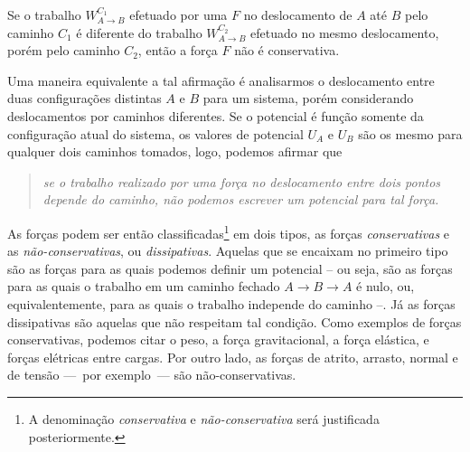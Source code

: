 \begin{marginfigure}
\centering
{}
\caption{Se o trabalho $W_{A\to B}^{C_1}$ efetuado por uma $F$ no deslocamento de $A$ até $B$ pelo caminho $C_1$ é diferente do trabalho $W_{A\to B}^{C_2}$ efetuado no mesmo deslocamento, porém pelo caminho $C_2$, então a força $F$ não é conservativa.}
\end{marginfigure}

Uma maneira equivalente a tal afirmação é analisarmos o deslocamento entre duas configurações distintas $A$ e $B$ para um sistema, porém considerando deslocamentos por caminhos diferentes. Se o potencial é função somente da configuração atual do sistema, os valores de potencial $U_A$ e $U_B$ são os mesmo para qualquer dois caminhos tomados, logo, podemos afirmar que
\begin{quote}
\emph{se o trabalho realizado por uma força no deslocamento entre dois pontos depende do caminho, não podemos escrever um potencial para tal força.}
\end{quote}

As forças podem ser então classificadas\footnote{A denominação \emph{conservativa} e \emph{não-conservativa} será justificada posteriormente.} em dois tipos, as forças \emph{conservativas} e as \emph{não-conservativas}, ou \emph{dissipativas}. Aquelas que se encaixam no primeiro tipo são as forças para as quais podemos definir um potencial -- ou seja, são as forças para as quais o trabalho em um caminho fechado $A\to B\to A$ é nulo, ou, equivalentemente, para as quais o trabalho independe do caminho --. Já as forças dissipativas são aquelas que não respeitam tal condição. Como exemplos de forças conservativas, podemos citar o peso, a força gravitacional, a força elástica, e forças elétricas entre cargas. Por outro lado, as forças de atrito, arrasto, normal e de tensão ---~por exemplo~--- são não-conservativas.

